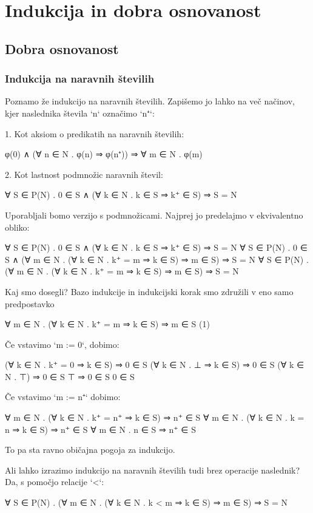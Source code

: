 \chapter{Indukcija in dobra osnovanost}

\section{Dobra osnovanost}

\subsection{Indukcija na naravnih številih}

Poznamo že indukcijo na naravnih številih. Zapišemo jo lahko na več načinov,
kjer naslednika števila `n` označimo `n⁺`:

1. Kot aksiom o predikatih na naravnih številih:

        φ(0) ∧ (∀ n ∈ N . φ(n) ⇒ φ(n⁺)) ⇒ ∀ m ∈ N . φ(m)

2. Kot lastnost podmnožic naravnih števil:

        ∀ S ∈ P(N) . 0 ∈ S ∧ (∀ k ∈ N . k ∈ S ⇒ k⁺ ∈ S) ⇒ S = N

Uporabljali bomo verzijo s podmnožicami. Najprej jo predelajmo v ekvivalentno obliko:

    ∀ S ∈ P(N) . 0 ∈ S ∧ (∀ k ∈ N . k ∈ S ⇒ k⁺ ∈ S) ⇒ S = N
    ∀ S ∈ P(N) . 0 ∈ S ∧ (∀ m ∈ N . (∀ k ∈ N . k⁺ = m ⇒ k ∈ S) ⇒ m ∈ S) ⇒ S = N
    ∀ S ∈ P(N) . (∀ m ∈ N . (∀ k ∈ N . k⁺ = m ⇒ k ∈ S) ⇒ m ∈ S) ⇒ S = N

Kaj smo dosegli? Bazo indukcije in indukcijski korak smo združili v eno samo predpostavko

    ∀ m ∈ N . (∀ k ∈ N . k⁺ = m ⇒ k ∈ S) ⇒ m ∈ S          (1)

Če vstavimo `m := 0`, dobimo:

    (∀ k ∈ N . k⁺ = 0 ⇒ k ∈ S) ⇒ 0 ∈ S
    (∀ k ∈ N . ⊥ ⇒ k ∈ S) ⇒ 0 ∈ S
    (∀ k ∈ N . ⊤) ⇒ 0 ∈ S
    ⊤ ⇒ 0 ∈ S
    0 ∈ S

Če vstavimo `m := n⁺` dobimo:

    ∀ m ∈ N . (∀ k ∈ N . k⁺ = n⁺ ⇒ k ∈ S) ⇒ n⁺ ∈ S
    ∀ m ∈ N . (∀ k ∈ N . k = n ⇒ k ∈ S) ⇒ n⁺ ∈ S
    ∀ m ∈ N . n ∈ S ⇒ n⁺ ∈ S

To pa sta ravno običajna pogoja za indukcijo.

Ali lahko izrazimo indukcijo na naravnih številih tudi brez operacije naslednik?
Da, s pomočjo relacije `<`:

    ∀ S ∈ P(N) . (∀ m ∈ N . (∀ k ∈ N . k < m ⇒ k ∈ S) ⇒ m ∈ S) ⇒ S = N

